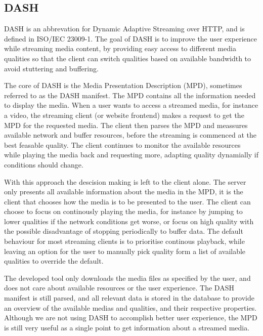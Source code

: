 \subsection{DASH}
DASH is an abbrevation for Dynamic Adaptive Streaming over HTTP, and is
defined in ISO/IEC 23009-1. The goal of DASH is to improve the user
experience while streaming media content, by providing easy access to
different media qualities so that the client can switch qualities based
on available bandwidth to avoid stuttering and buffering.

The core of DASH is the Media Presentation Description (MPD), sometimes
referred to as the DASH manifest. The MPD contains all the information
needed to display the media. When a user wants to access a streamed
media, for instance a video, the streaming client (or website frontend)
makes a request to get the MPD for the requested media. The client then
parses the MPD and meassures available network and buffer resources,
before the streaming is commenced at the best feasable quality. The
client continues to monitor the available resources while playing the
media back and requesting more, adapting quality dynamially if conditions
should change.

With this approach the descision making is left to the client alone. The
server only presents all available information about the media in the
MPD, it is the client that chooses how the media is to be presented to
the user. The client can choose to focus on continously playing the
media, for instance by jumping to lower qualities if the network
conditions get worse, or focus on high quality with the possible
disadvantage of stopping periodically to buffer data. The default
behaviour for most streaming clients is to prioritise continous playback,
while leaving an option for the user to manually pick quality form a list
of available qualities to override the default.

The developed tool only downloads the media files as specified by the
user, and does not care about available resources or the user experience.
The DASH manifest is still parsed, and all relevant data is stored in the
database to provide an overview of the available medias and qualities,
and their respective properties. Although we are not using DASH to
accomplish better user experience, the MPD is still very useful as a
single point to get information about a streamed media.

